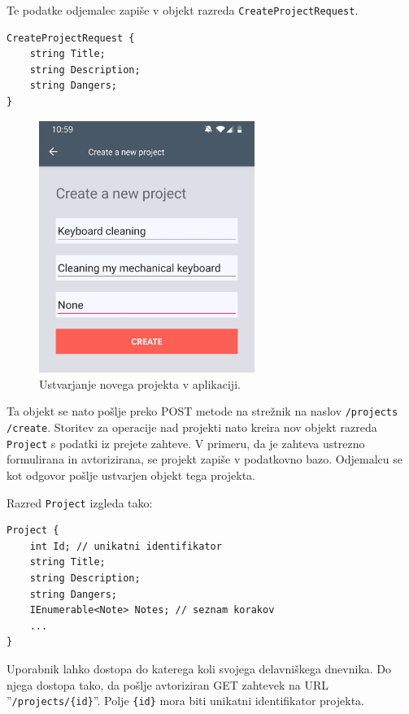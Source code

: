 \documentclass[a4paper, 12pt]{book}
\begin{document}
Te podatke odjemalec zapiše v objekt razreda \texttt{CreateProjectRequest}.

\begin{verbatim}
CreateProjectRequest { 
    string Title;  
    string Description; 
    string Dangers; 
} 
\end{verbatim}

\begin{figure}[H]
\begin{center}
\includegraphics[width=7cm]{app_create_new_small}
\end{center}
	\caption{Ustvarjanje novega projekta v aplikaciji.}
\label{app_create_new}
\end{figure}

\noindent Ta objekt se nato pošlje preko POST metode na strežnik na naslov \texttt{/projects\\/create}.
Storitev za operacije nad projekti nato kreira nov objekt razreda \texttt{Project} s podatki iz prejete zahteve.
V primeru, da je zahteva ustrezno formulirana in avtorizirana, se projekt zapiše v podatkovno bazo.
Odjemalcu se kot odgovor pošlje ustvarjen objekt tega projekta.

\noindent Razred \texttt{Project} izgleda tako:

\begin{verbatim}
Project { 
    int Id; // unikatni identifikator 
    string Title; 
    string Description; 
    string Dangers; 
    IEnumerable<Note> Notes; // seznam korakov 
    ... 
}
\end{verbatim}

Uporabnik lahko dostopa do katerega koli svojega delavniškega dnevnika.
Do njega dostopa tako, da pošlje avtoriziran GET zahtevek na URL ''\texttt{/projects/\{id\}}''.
Polje \texttt{\{id\}} mora biti unikatni identifikator projekta.
\end{document}
